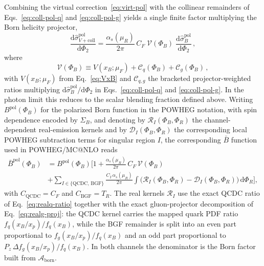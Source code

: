 \documentclass[a4paper,11pt]{article}
\begin{document}
Combining the virtual correction~\eqref{eq:virt-pol} with the collinear remainders of Eqs.~\eqref{eq:coll-pol-q} and \eqref{eq:coll-pol-g} yields a single finite factor multiplying the Born helicity projector,
\begin{equation}
\frac{\mathrm{d}\hat\sigma_{V+\text{coll}}^{\text{pol}}}{\mathrm{d}\Phi_2}
=
\frac{\alpha_s(\mu_R)}{2\pi}\,C_F\;
\mathcal{V}(\Phi_B)\;
\frac{\mathrm{d}\hat\sigma_B^{\text{pol}}}{\mathrm{d}\Phi_2}\,,
\label{eq:Vpluscoll-pol}
\end{equation}
where
\begin{equation}
\mathcal{V}(\Phi_B)\equiv V(x_B;\mu_F)
+\mathcal{C}_q(\Phi_B)+\mathcal{C}_g(\Phi_B)\,,
\label{eq:Vcal}
\end{equation}
with $V(x_B;\mu_F)$ from Eq.~\eqref{eq:VxB} and $\mathcal{C}_{q,g}$ the bracketed projector-weighted ratios multiplying $\mathrm{d}\hat\sigma_B^{\text{pol}}/\mathrm{d}\Phi_2$ in Eqs.~\eqref{eq:coll-pol-q} and \eqref{eq:coll-pol-g}.  In the photon limit this reduces to the scalar blending fraction defined above.
Writing $B^{\text{pol}}(\Phi_B)$ for the polarized Born function in the POWHEG notation, with spin dependence encoded by $\Sigma_B$, and denoting by $\mathcal{R}_I(\Phi_B,\Phi_R)$ the channel-dependent real-emission kernels and by $\mathcal{D}_I(\Phi_B,\Phi_R)$ the corresponding local POWHEG subtraction terms for singular region $I$, the corresponding $\bar B$ function used in POWHEG/MC@NLO reads
\begin{align}
\bar B^{\text{pol}}(\Phi_B)
&=B^{\text{pol}}(\Phi_B)\Bigg[
1+\frac{\alpha_s(\mu_R)}{2\pi}\,C_F\,\mathcal{V}(\Phi_B)
\nonumber \\[1mm]
&+\sum_{I\in\{\mathrm{QCDC},\,\mathrm{BGF}\}}
\frac{C_I\,\alpha_s(\mu_R)}{2\pi}
\int\!\big(\mathcal{R}_I(\Phi_B,\Phi_R)-\mathcal{D}_I(\Phi_B,\Phi_R)\big)\,\mathrm{d}\Phi_R
\Bigg],
\label{eq:Bbar-pol}
\end{align}
with $C_{\mathrm{QCDC}}=C_F$ and $C_{\mathrm{BGF}}=T_R$.  The real kernels $\mathcal{R}_I$ use the exact QCDC ratio of Eq.~\eqref{eq:realq-ratio} together with the exact gluon-projector decomposition of Eq.~\eqref{eq:realg-proj}: the QCDC kernel carries the mapped quark PDF ratio $f_q(x_B/x_p)/f_q(x_B)$, while the BGF remainder is split into an even part proportional to $f_g(x_B/x_p)/f_q(x_B)$ and an odd part proportional to $P_z\,\Delta f_g(x_B/x_p)/f_q(x_B)$.  In both channels the denominator is the Born factor built from $\mathcal{A}_{\text{born}}$.
\end{document}
